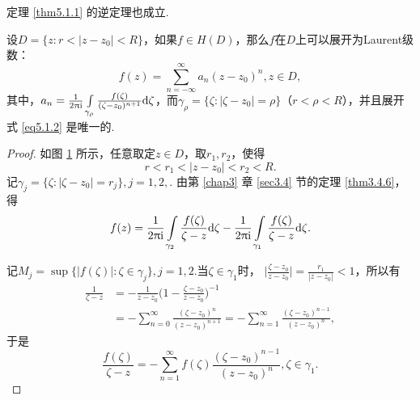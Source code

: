 定理 \ref{thm5.1.1} 的逆定理也成立.
\begin{theorem}\label{thm5.1.2}
设$D=\{z:r<|z-z_0|<R\}$，如果$f\in H(D)$，那么$f$在$D$上可以展开为Laurent级数：
\begin{equation}\label{eq5.1.2}
f(z)=\sum_{n=-\infty}^\infty a_n(z-z_0)^n,z\in D,
\end{equation}
其中，$a_n=\frac1{2\uppi\mathrm i}\int\limits_{\gamma_\rho}\frac{f(\zeta)}{(\zeta-z_0)^{n+1}}
\textrm d\zeta$，而$\gamma_\rho=\{\zeta:|\zeta-z_0|=\rho\}$（$r<\rho<R$），并且展开式 \eqref{eq5.1.2} 是唯一的.
\end{theorem}
\begin{proof}
如图 \ref{fig5.1} 所示，任意取定$z\in D$，取$r_1,r_2$，使得
\[r<r_1<|z-z_0|<r_2<R.\]
记$\gamma_j=\{\zeta:|\zeta-z_0|=r_j\},j=1,2,$. 由第 \ref{chap3} 章 \ref{sec3.4} 节的定理 \ref{thm3.4.6}，得
\begin{equation}\label{eq5.1.3}
f(z)=\frac1{2\uppi\mathrm i}\int\limits_{\gamma_2}\frac{f(\zeta)}{\zeta-z}\textrm d\zeta-
\frac1{2\uppi\mathrm i}\int\limits_{\gamma_1}\frac{f(\zeta)}{\zeta-z}\textrm d\zeta.
\end{equation}
\begin{figure}[!ht]
\centering
{}
\caption{\label{fig5.1}}
\end{figure}
记$M_j=\sup\{|f(\zeta)|:\zeta\in\gamma_j\},j=1,2$.当$\zeta\in\gamma_1$时，
$\bigg|\frac{\zeta-z_0}{z-z_0}\bigg|=\frac{r_1}{|z-z_0|}<1$，所以有
\begin{align*}
\frac1{\zeta-z}&=-\frac1{z-z_0}\bigg(1-\frac{\zeta-z_0}{z-z_0}\bigg)^{-1}\\
&=-\sum_{n=0}^\infty\frac{(\zeta-z_0)^n}{(z-z_0)^{n+1}}=-
\sum_{n=1}^\infty\frac{(\zeta-z_0)^{n-1}}{(z-z_0)^{n}},
\end{align*}
于是
\begin{equation}\label{eq5.1.4}
\frac{f(\zeta)}{\zeta-z}=-\sum_{n=1}^\infty f(\zeta)\frac{(\zeta-z_0)^{n-1}}{(z-z_0)^{n}},\zeta\in\gamma_1.

\end{equation}
\end{proof}
